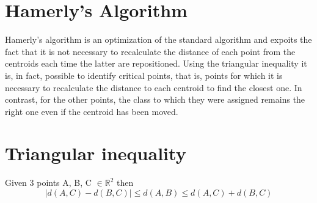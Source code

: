 \documentclass{report}
\begin{document}
\begin{minipage}[b]{0.48\textwidth}
    \section*{Hamerly's Algorithm}
    Hamerly's algorithm is an optimization of the standard algorithm and expoits the fact that it is not necessary to recalculate the distance of each point from the centroids each time the latter are repositioned. Using the triangular inequality it is, in fact, possible to identify critical points, that is, points for which it is necessary to recalculate the distance to each centroid to find the closest one. In contrast, for the other points, the class to which they were assigned remains the right one even if the centroid has been moved.

    \section*{Triangular inequality}
    Given 3 points A, B, C $\in \mathbb{R}^2$ then  
    \begin{equation}
      |d(A, C) - d(B, C)| \leq d(A, B) \leq d(A, C) + d(B, C)
    \end{equation}

\end{minipage}

\newpage
\end{document}
